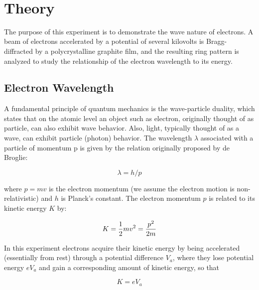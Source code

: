 \documentclass{tufte-handout}
\begin{document}



\vspace{0.5cm}
\\
\vspace{0.5cm}

\section{Theory}

The purpose of this experiment is to demonstrate the wave nature of electrons. A
beam of electrons accelerated by a potential of several kilovolts is
Bragg-diffracted by a polycrystalline graphite film, and the resulting ring
pattern is analyzed to study the relationship of the electron wavelength to its
energy.

\subsection{Electron Wavelength}

A fundamental principle of quantum mechanics is the wave-particle
duality, which states that on the atomic level an object such as
electron, originally thought of as particle, can also exhibit wave
behavior.  Also, light, typically thought of as a wave, can exhibit
particle (photon) behavior.  The wavelength $\lambda$ associated
with a particle of momentum p is given by the relation originally
proposed by de Broglie:

\begin{equation}
\lambda = h/p
\label{eq:debroglie}
\end{equation}

\noindent where $p = mv$ is the electron momentum (we assume the electron motion
is non-relativistic) and $h$ is Planck's constant.  The electron momentum $p$ is
related to its kinetic energy $K$ by:

\begin{equation}
K = {1 \over 2} mv^2 = {p^2 \over 2m}
\label{eq:ke}
\end{equation}

In this experiment electrons acquire their kinetic energy by being accelerated
(essentially from rest) through a potential difference $V_a$, where they lose
potential energy $eV_a$ and gain a corresponding amount of kinetic energy, so
that

\begin{equation}
K = eV_a
\label{eq:kev}
\end{equation}
\end{document}
